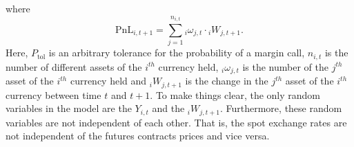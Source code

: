 where
\begin{displaymath}
\mbox{PnL}_{i,t+1}=\sum_{j=1}^{n_{i,t}} {}_i\omega_{j,t} \cdot {}_i
W_{j,t+1}.
\end{displaymath}
Here, $P_{\mbox{tol}}$ is an arbitrary tolerance for the probability
of a margin call,  $n_{i,t}$ is the number of different assets of
the $i^{th}$ currency held,  ${}_i\omega_{j,t}$ is the number of the
$j^{th}$ asset of the  $i^{th}$ currency held and ${}_i W_{j,t+1}$
is the change in the $j^{th}$ asset of the $i^{th}$ currency between
time $t$ and $t+1$. To make things clear, the only random variables
in the model are the $Y_{i,t}$ and the ${}_i W_{j,t+1}$.
Furthermore, these random variables are not independent of each
other. That is, the spot exchange rates are not independent of the
futures contracts prices and vice versa.

